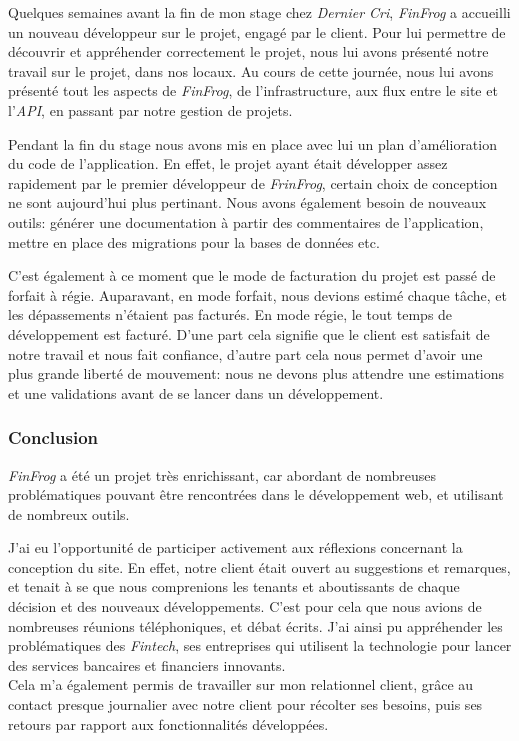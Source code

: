 Quelques semaines avant la fin de mon stage chez \emph{Dernier Cri},
\emph{FinFrog} a accueilli un nouveau développeur sur le projet, engagé
par le client. Pour lui permettre de découvrir et appréhender
correctement le projet, nous lui avons présenté notre travail sur le
projet, dans nos locaux. Au cours de cette journée, nous lui avons
présenté tout les aspects de \emph{FinFrog}, de l'infrastructure, aux
flux entre le site et l'\emph{API}, en passant par notre gestion de
projets.

\bigskip

Pendant la fin du stage nous avons mis en place avec lui un plan
d'amélioration du code de l'application. En effet, le projet ayant était
développer assez rapidement par le premier développeur de
\emph{FrinFrog}, certain choix de conception ne sont aujourd'hui plus
pertinant. Nous avons également besoin de nouveaux outils: générer une
documentation à partir des commentaires de l'application, mettre en
place des migrations pour la bases de données etc.

\bigskip

C'est également à ce moment que le mode de facturation du projet est
passé de forfait à régie. Auparavant, en mode forfait, nous devions
estimé chaque tâche, et les dépassements n'étaient pas facturés. En mode
régie, le tout temps de développement est facturé. D'une part cela
signifie que le client est satisfait de notre travail et nous fait
confiance, d'autre part cela nous permet d'avoir une plus grande liberté
de mouvement: nous ne devons plus attendre une estimations et une
validations avant de se lancer dans un développement.

\bigskip

\subsubsection{Conclusion}\label{conclusion-1}

\emph{FinFrog} a été un projet très enrichissant, car abordant de
nombreuses problématiques pouvant être rencontrées dans le développement
web, et utilisant de nombreux outils.

\bigskip

J'ai eu l'opportunité de participer activement aux réflexions concernant
la conception du site. En effet, notre client était ouvert au
suggestions et remarques, et tenait à se que nous comprenions les
tenants et aboutissants de chaque décision et des nouveaux
développements. C'est pour cela que nous avions de nombreuses réunions
téléphoniques, et débat écrits. J'ai ainsi pu appréhender les
problématiques des \emph{Fintech}, ses entreprises qui utilisent la
technologie pour lancer des services bancaires et financiers
innovants.\\
Cela m'a également permis de travailler sur mon relationnel client,
grâce au contact presque journalier avec notre client pour récolter ses
besoins, puis ses retours par rapport aux fonctionnalités développées.

